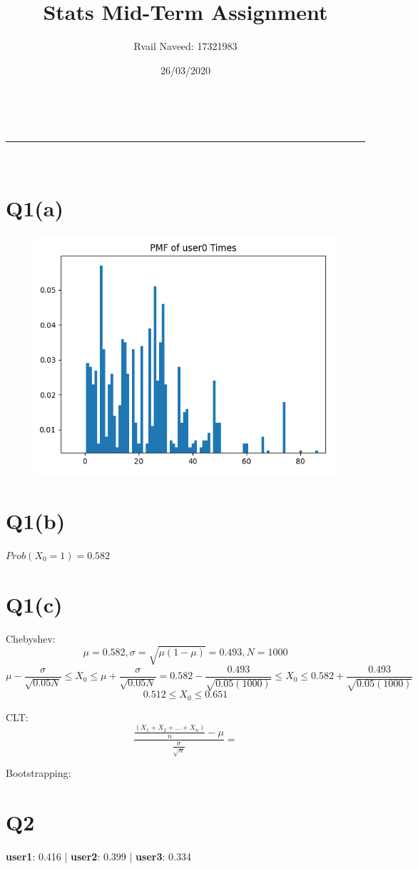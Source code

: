 \documentclass[a4paper,11pt]{article}
\makeatletter
\newcommand{\linia}{\rule{\linewidth}{0.5pt}}
\theoremstyle{mytheor}
\renewcommand{\maketitle}{
\begin{center}
\vspace{2ex}
{\huge \textsc{\@title}}
\vspace{1ex}
\\
\linia\\
\@author \hfill \@date
\vspace{4ex}
\end{center}
}
\makeatother
\begin{document}
\title{Stats Mid-Term Assignment}

\author{Rvail Naveed: 17321983}

\date{26/03/2020}

\maketitle

\section*{Q1(a)}
    \begin{figure}[h]
        \centering
        \includegraphics[scale=0.3]{pmf.png}
    \end{figure}

\section*{Q1(b)} 
    $Prob(X_0 = 1) = 0.582$ 

\section*{Q1(c)} 
    Chebyshev: 
    $$ \mu = 0.582,  \sigma = \sqrt{\mu(1-\mu)} = 0.493, N=1000 $$
    $$ \mu - \frac{\sigma}{\sqrt{0.05N}} \leq X_0 \leq \mu + \frac{\sigma}{\sqrt{0.05N}} = 0.582 - \frac{0.493}{\sqrt{0.05(1000)}} \leq X_0 \leq 0.582 + \frac{0.493}{\sqrt{0.05(1000)}}$$ 
    $$ 0.512 \leq X_0 \leq 0.651 $$ \newline

    CLT:
    $$ \frac{\frac{(X_1+X_2+...+X_n)}{n} - \mu}{\frac{\sigma}{\sqrt{n}}}  = $$

    Bootstrapping:
    $$ $$
\section*{Q2}
    \textbf{user1}: 0.416 | \textbf{user2}: 0.399 | \textbf{user3}: 0.334
\end{document}
